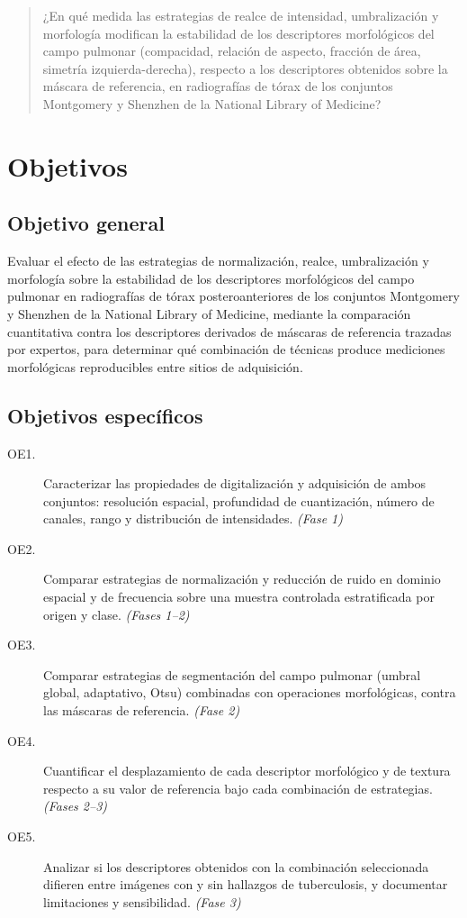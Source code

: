 \documentclass[12pt,a4paper]{article}
\begin{document}
\begin{quote}
¿En qué medida las estrategias de realce de intensidad, umbralización y
morfología modifican la estabilidad de los descriptores morfológicos del campo
pulmonar (compacidad, relación de aspecto, fracción de área, simetría
izquierda-derecha), respecto a los descriptores obtenidos sobre la máscara de
referencia, en radiografías de tórax de los conjuntos Montgomery y Shenzhen de la
National Library of Medicine?
\end{quote}

\section{Objetivos}

\subsection{Objetivo general}

Evaluar el efecto de las estrategias de normalización, realce, umbralización y
morfología sobre la estabilidad de los descriptores morfológicos del campo
pulmonar en radiografías de tórax posteroanteriores de los conjuntos Montgomery y
Shenzhen de la National Library of Medicine, mediante la comparación cuantitativa
contra los descriptores derivados de máscaras de referencia trazadas por
expertos, para determinar qué combinación de técnicas produce mediciones
morfológicas reproducibles entre sitios de adquisición.

\subsection{Objetivos específicos}

\begin{description}
    \item[OE1.] Caracterizar las propiedades de digitalización y adquisición de
    ambos conjuntos: resolución espacial, profundidad de cuantización, número de
    canales, rango y distribución de intensidades. \emph{(Fase 1)}

    \item[OE2.] Comparar estrategias de normalización y reducción de ruido en
    dominio espacial y de frecuencia sobre una muestra controlada estratificada
    por origen y clase. \emph{(Fases 1--2)}

    \item[OE3.] Comparar estrategias de segmentación del campo pulmonar (umbral
    global, adaptativo, Otsu) combinadas con operaciones morfológicas, contra las
    máscaras de referencia. \emph{(Fase 2)}

    \item[OE4.] Cuantificar el desplazamiento de cada descriptor morfológico y de
    textura respecto a su valor de referencia bajo cada combinación de
    estrategias. \emph{(Fases 2--3)}

    \item[OE5.] Analizar si los descriptores obtenidos con la combinación
    seleccionada difieren entre imágenes con y sin hallazgos de tuberculosis, y
    documentar limitaciones y sensibilidad. \emph{(Fase 3)}
\end{description}
\end{document}
